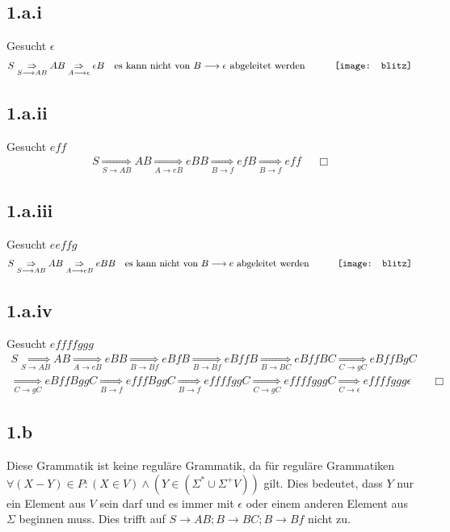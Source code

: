 \documentclass[10pt,ngerman]{scrartcl}
\begin{document}
\subsection{1.a.i}
Gesucht $\epsilon$
\begin{align*}
 S \underset{S \longrightarrow AB }{\Rightarrow} AB \underset{A \longrightarrow \epsilon }{\Rightarrow} \epsilon B && \text{es kann nicht von }B \longrightarrow \epsilon \text{ abgeleitet werden} && \qquad \vcenter{\hbox{\texttt{[image: blitz]}}}
\end{align*}
\subsection{1.a.ii}
Gesucht $eff$
\begin{align*}
 S \underset{S \longrightarrow AB}{\Rightarrow} AB \underset{A \longrightarrow eB}{\Rightarrow} eBB \underset{B \longrightarrow f}{\Rightarrow} efB \underset{B \longrightarrow f}{\Rightarrow} eff && \Box
\end{align*}
\subsection{1.a.iii}
Gesucht $eeffg$
\begin{align*}
S \underset{S \longrightarrow AB}{\Rightarrow} AB \underset{A \longrightarrow eB}{\Rightarrow} eBB && \text{es kann nicht von } B \longrightarrow e \text{ abgeleitet werden} && \qquad \vcenter{\hbox{\texttt{[image: blitz]}}}
\end{align*}
\subsection{1.a.iv}
Gesucht $effffggg$
\begin{align*}
S \underset{S \longrightarrow AB}{\Rightarrow} AB \underset{A \longrightarrow eB}{\Rightarrow} eBB \underset{B \longrightarrow Bf}{\Rightarrow} eBfB \underset{B \longrightarrow Bf }{\Rightarrow} eBffB \underset{B \longrightarrow BC}{\Rightarrow} eBffBC \underset{C \longrightarrow gC }{\Rightarrow} eBffBgC\\
\underset{C \longrightarrow gC}{\Rightarrow} eBffBggC \underset{B \longrightarrow f}{\Rightarrow} efffBggC \underset{B \longrightarrow f}{\Rightarrow} effffggC \underset{C \longrightarrow gC }{\Rightarrow} effffgggC \underset{C \longrightarrow \epsilon}{\Rightarrow} effffggg\epsilon && \Box
\end{align*}
\subsection{1.b}
Diese Grammatik ist keine reguläre Grammatik, da für reguläre Grammatiken $\forall(X-Y) \in P : (X \in V) \wedge (Y \in (\Sigma^* \cup \Sigma^+V))$ gilt. Dies bedeutet, dass $Y$ nur ein Element aus $V$ sein darf und es immer mit $\epsilon$ oder einem anderen Element aus $\Sigma$ beginnen muss. Dies trifft auf
$S \longrightarrow AB ; B \longrightarrow BC ; B \longrightarrow Bf$ nicht zu.
\pagebreak
\end{document}
